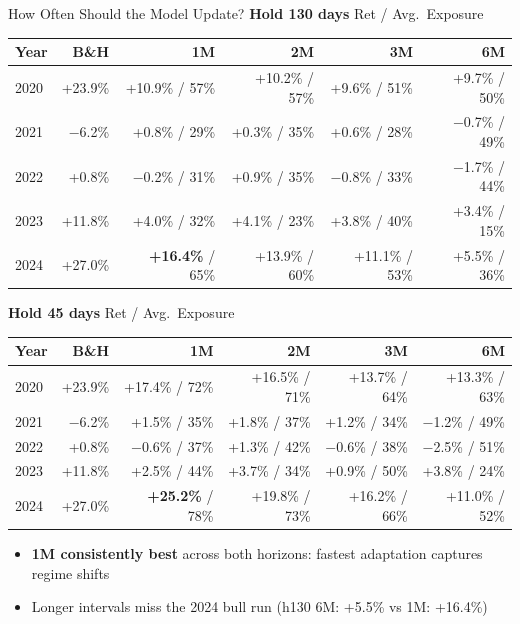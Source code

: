 \documentclass[aspectratio=169]{beamer}
\begin{document}
\begin{frame}{How Often Should the Model Update?}
  \small
  \textbf{Hold 130 days} \hfill Ret / Avg.\ Exposure

  \vspace{0.3em}
  \begin{tabular}{lrrrrr}
    \toprule
    Year & B\&H & 1M & 2M & 3M & 6M \\
    \midrule
    2020 & +23.9\% & +10.9\% / 57\% & +10.2\% / 57\% & +9.6\% / 51\% & +9.7\% / 50\% \\
    2021 & $-$6.2\%  & +0.8\% / 29\% & +0.3\% / 35\% & +0.6\% / 28\% & $-$0.7\% / 49\% \\
    2022 & +0.8\%  & $-$0.2\% / 31\% & +0.9\% / 35\% & $-$0.8\% / 33\% & $-$1.7\% / 44\% \\
    2023 & +11.8\% & +4.0\% / 32\% & +4.1\% / 23\% & +3.8\% / 40\% & +3.4\% / 15\% \\
    2024 & +27.0\% & \textbf{+16.4\%} / 65\% & +13.9\% / 60\% & +11.1\% / 53\% & +5.5\% / 36\% \\
    \bottomrule
  \end{tabular}

  \vspace{0.5em}
  \textbf{Hold 45 days} \hfill Ret / Avg.\ Exposure

  \vspace{0.3em}
  \begin{tabular}{lrrrrr}
    \toprule
    Year & B\&H & 1M & 2M & 3M & 6M \\
    \midrule
    2020 & +23.9\% & +17.4\% / 72\% & +16.5\% / 71\% & +13.7\% / 64\% & +13.3\% / 63\% \\
    2021 & $-$6.2\%  & +1.5\% / 35\% & +1.8\% / 37\% & +1.2\% / 34\% & $-$1.2\% / 49\% \\
    2022 & +0.8\%  & $-$0.6\% / 37\% & +1.3\% / 42\% & $-$0.6\% / 38\% & $-$2.5\% / 51\% \\
    2023 & +11.8\% & +2.5\% / 44\% & +3.7\% / 34\% & +0.9\% / 50\% & +3.8\% / 24\% \\
    2024 & +27.0\% & \textbf{+25.2\%} / 78\% & +19.8\% / 73\% & +16.2\% / 66\% & +11.0\% / 52\% \\
    \bottomrule
  \end{tabular}

  \vspace{0.4em}
  \begin{itemize}
    \item \textbf{1M consistently best} across both horizons: fastest adaptation captures regime shifts
    \item Longer intervals miss the 2024 bull run (h130 6M: +5.5\% vs 1M: +16.4\%)
  \end{itemize}
\end{frame}
\end{document}
